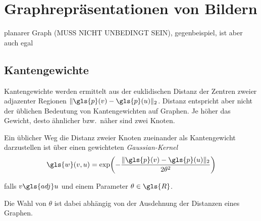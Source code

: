 \chapter{Graphrepräsentationen von Bildern}

planarer Graph (MUSS NICHT UNBEDINGT SEIN), gegenbeispiel, ist aber auch egal

\section{Kantengewichte}

Kantengewichte werden ermittelt aus der euklidischen Distanz der Zentren zweier adjazenter Regionen $\left\|\gls{p}\left(v\right) - \gls{p}\left(u\right)\right\|_2$.
Distanz entspricht aber nicht der üblichen Bedeutung von Kantengewichten auf Graphen.
Je höher das Gewicht, desto ähnlicher bzw.\ näher sind zwei Knoten.

Ein üblicher Weg die Distanz zweier Knoten zueinander als Kantengewicht darzustellen ist über einen gewichteten \emph{Gaussian-Kernel}~\cite{Shuman}
\begin{equation}
  \gls{w}\left(v, u\right) = \exp\left(-\frac{\left\|\gls{p}\left(v\right) - \gls{p}\left(u\right)\right\|_2}{2\theta^2}\right)
\end{equation}

falls $v \gls{adj} u$ und einem Parameter $\theta \in \gls{R}$.

Die Wahl von $\theta$ ist dabei abhängig von der Ausdehnung der Distanzen eines Graphen.

\begin{center}
\end{center}
